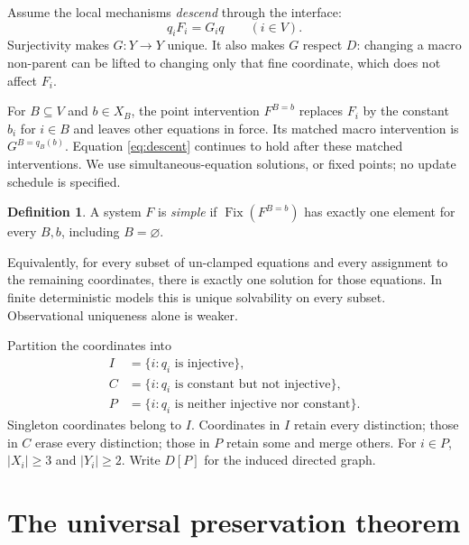 \documentclass[11pt,a4paper]{article}
\theoremstyle{definition}
\newtheorem{definition}[theorem]{Definition}
\theoremstyle{remark}
\DeclareMathOperator{\Fix}{Fix}
\begin{document}
Assume the local mechanisms \emph{descend} through the interface:
\begin{equation}\label{eq:descent}
 q_iF_i=G_iq\qquad(i\in V).
\end{equation}
Surjectivity makes $G:Y\to Y$ unique. It also makes $G$ respect $D$: changing a macro non-parent can be lifted to changing only that fine coordinate, which does not affect $F_i$.

For $B\subseteq V$ and $b\in X_B$, the point intervention $F^{B=b}$ replaces $F_i$ by the constant $b_i$ for $i\in B$ and leaves other equations in force. Its matched macro intervention is $G^{B=q_B(b)}$. Equation \eqref{eq:descent} continues to hold after these matched interventions. We use simultaneous-equation solutions, or fixed points; no update schedule is specified.

\begin{definition}
A system $F$ is \emph{simple} if $\Fix(F^{B=b})$ has exactly one element for every $B,b$, including $B=\varnothing$.
\end{definition}

Equivalently, for every subset of un-clamped equations and every assignment to the remaining coordinates, there is exactly one solution for those equations. In finite deterministic models this is unique solvability on every subset. Observational uniqueness alone is weaker.

Partition the coordinates into
\begin{align}
 I&=\{i:q_i\text{ is injective}\},\nonumber\\
 C&=\{i:q_i\text{ is constant but not injective}\},\label{eq:types}\\
 P&=\{i:q_i\text{ is neither injective nor constant}\}.\nonumber
\end{align}
Singleton coordinates belong to $I$. Coordinates in $I$ retain every distinction; those in $C$ erase every distinction; those in $P$ retain some and merge others. For $i\in P$, $|X_i|\ge3$ and $|Y_i|\ge2$. Write $D[P]$ for the induced directed graph.

\section{The universal preservation theorem}
\end{document}
